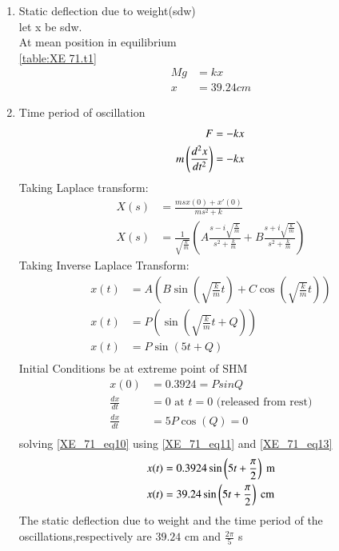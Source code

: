 \documentclass[journal,12pt,twocolumn]{IEEEtran}
\theoremstyle{remark}
\begin{document}
\begin{enumerate}
    \item Static deflection due to weight(sdw)\\
    let x be sdw.\\
    At mean position in equilibrium\\
     \ref{table:XE 71.t1}
    \begin{align}
        Mg&=kx\\
        x&=39.24cm
    \end{align}
     \item Time period of oscillation\\
        \begin{align}
           F&=-kx\\
           m\left(\frac{d^2x}{dt^2}\right)&=-kx
     \end{align}
     Taking Laplace transform:
     \begin{align}
      X(s) &= \frac{ms x(0) + x'(0)}{ms^2 + k} \\
       X(s) &= \frac{1}{\sqrt{\frac{k}{m}}} \left( A \frac{s - i \sqrt{\frac{k}{m}}}{s^2 + \frac{k}{m}} + B \frac{s + i \sqrt{\frac{k}{m}}}{s^2 + \frac{k}{m}} \right) 
     \end{align}
     Taking Inverse Laplace Transform:\\
     \begin{align}
      x(t) &=A \left( B \sin(\sqrt{\frac{k}{m}}t) + C\cos(\sqrt{\frac{k}{m}}t) \right)\\
       x(t) &=P \left(\sin(\sqrt{\frac{k}{m}}t+Q) \right)\\
        x(t) &=P \sin(5t+Q) \\\label{XE_71_eq10}
       \end{align}
        Initial Conditions be at extreme  point of SHM
       \begin{align}
       x(0)&=0.3924=P sinQ\\\label{XE_71_eq11}  
       \frac{dx}{dt}&=0 \text{ at } t=0 \text{ (released from rest)} \\
       \frac{dx}{dt}&=5P\cos(Q)=0\label{XE_71_eq13}\\
       \end{align}   
solving \ref{XE_71_eq10} using \ref{XE_71_eq11} and \ref{XE_71_eq13}
       \begin{align}
      x(t)&=0.3924\sin\left(5t+\frac{\pi}{2}\right)\text{ m}\\
      x(t)&=39.24 \sin\left(5t+\frac{\pi}{2}\right) \text{ cm}
     \end{align}
    The static deflection due to weight and the time period of the oscillations,respectively are $39.24$ cm and $\frac{2\pi}{5}$ s
\end{enumerate}
\end{document}
